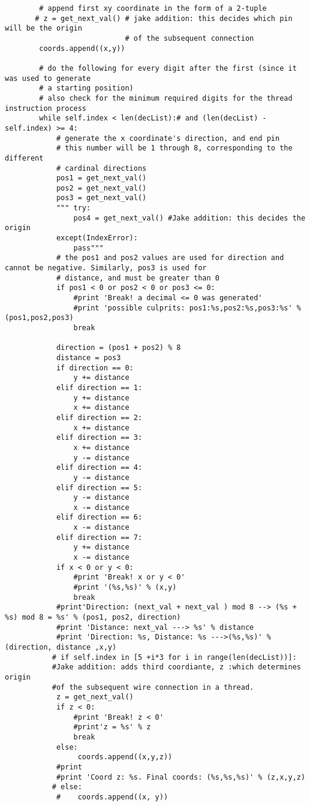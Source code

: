 \documentclass[a4paper]{article}
\begin{document}
\begin{enumerate}
\begin{verbatim}
        # append first xy coordinate in the form of a 2-tuple
       # z = get_next_val() # jake addition: this decides which pin will be the origin
                            # of the subsequent connection
        coords.append((x,y))

        # do the following for every digit after the first (since it was used to generate
        # a starting position)
        # also check for the minimum required digits for the thread instruction process
        while self.index < len(decList):# and (len(decList) - self.index) >= 4:
            # generate the x coordinate's direction, and end pin
            # this number will be 1 through 8, corresponding to the different
            # cardinal directions
            pos1 = get_next_val()
            pos2 = get_next_val()
            pos3 = get_next_val()
            """ try:
                pos4 = get_next_val() #Jake addition: this decides the origin
            except(IndexError):
                pass"""
            # the pos1 and pos2 values are used for direction and cannot be negative. Similarly, pos3 is used for
            # distance, and must be greater than 0
            if pos1 < 0 or pos2 < 0 or pos3 <= 0:
                #print 'Break! a decimal <= 0 was generated'
                #print 'possible culprits: pos1:%s,pos2:%s,pos3:%s' % (pos1,pos2,pos3)
                break

            direction = (pos1 + pos2) % 8
            distance = pos3
            if direction == 0:
                y += distance
            elif direction == 1:
                y += distance
                x += distance
            elif direction == 2:
                x += distance
            elif direction == 3:
                x += distance
                y -= distance
            elif direction == 4:
                y -= distance
            elif direction == 5:
                y -= distance
                x -= distance
            elif direction == 6:
                x -= distance
            elif direction == 7:
                y += distance
                x -= distance
            if x < 0 or y < 0:
                #print 'Break! x or y < 0'
                #print '(%s,%s)' % (x,y)
                break
            #print'Direction: (next_val + next_val ) mod 8 --> (%s + %s) mod 8 = %s' % (pos1, pos2, direction)
            #print 'Distance: next_val ---> %s' % distance
            #print 'Direction: %s, Distance: %s --->(%s,%s)' % (direction, distance ,x,y)
           # if self.index in [5 +i*3 for i in range(len(decList))]:
           #Jake addition: adds third coordiante, z :which determines origin
           #of the subsequent wire connection in a thread.
            z = get_next_val()
            if z < 0:
                #print 'Break! z < 0'
                #print'z = %s' % z
                break
            else:
                 coords.append((x,y,z))
            #print
            #print 'Coord z: %s. Final coords: (%s,%s,%s)' % (z,x,y,z)
           # else:
            #    coords.append((x, y))


\end{verbatim}
\end{enumerate}
\end{document}
